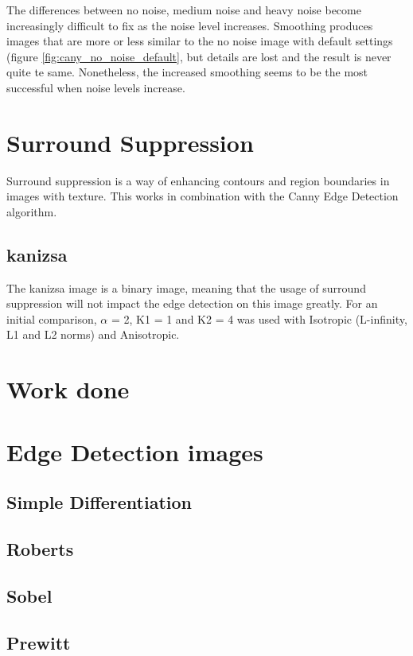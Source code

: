 \documentclass[10pt,a4paper]{article}
\begin{document}
The differences between no noise, medium noise and heavy noise become increasingly difficult to fix as the noise level increases. Smoothing produces images that are more or less similar to the no noise image with default settings (figure \ref{fig:cany_no_noise_default}, but details are lost and the result is never quite te same. Nonetheless, the increased smoothing seems to be the most successful when noise levels increase. 

\section{Surround Suppression}
Surround suppression is a way of enhancing contours and region boundaries in images with texture. This works in combination with the Canny Edge Detection algorithm.

\subsection{kanizsa}
The kanizsa image is a binary image, meaning that the usage of surround suppression will not impact the edge detection on this image greatly.
For an initial comparison, $\alpha$ = 2, K1 = 1 and K2 = 4 was used with Isotropic (L-infinity, L1 and L2 norms) and Anisotropic.

\section{Work done}

\section{Edge Detection images}
\subsection{Simple Differentiation}



\subsection{Roberts}


\subsection{Sobel}


\subsection{Prewitt}
\end{document}
